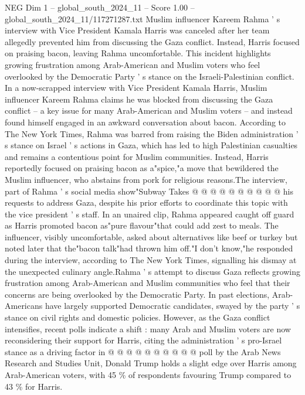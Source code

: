 \begin{textsample}{NEG Dim 1 – global\_south\_2024\_11 – Score 1.00 – global\_south\_2024\_11/117271287.txt}  \label{ex:f1_neg_283}
Muslim influencer Kareem Rahma ' s interview with Vice President Kamala Harris was canceled after her team allegedly prevented him from discussing the Gaza conflict.
Instead, Harris focused on praising bacon, leaving Rahma uncomfortable.
This incident highlights growing frustration among Arab-American and Muslim voters who feel overlooked by the Democratic Party ' s stance on the Israeli-Palestinian conflict.
In a now-scrapped interview with Vice President Kamala Harris, Muslim influencer Kareem Rahma claims he was blocked from discussing the Gaza conflict -- a key issue for many Arab-American and Muslim voters -- and instead found himself engaged in an awkward conversation about bacon.
According to The New York Times, Rahma was barred from raising the Biden administration ' s stance on Israel ' s actions in Gaza, which has led to high Palestinian casualties and remains a contentious point for Muslim communities.
Instead, Harris reportedly focused on praising bacon as a"spice,"a move that bewildered the Muslim influencer, who abstains from pork for religious reasons.The interview, part of Rahma ' s social media show"Subway Takes @ @ @ @ @ @ @ @ @ @ his requests to address Gaza, despite his prior efforts to coordinate this topic with the vice president ' s staff.
In an unaired clip, Rahma appeared caught off guard as Harris promoted bacon as"pure flavour"that could add zest to meals.
The influencer, visibly uncomfortable, asked about alternatives like beef or turkey but noted later that the"bacon talk"had thrown him off."I don't know,"he responded during the interview, according to The New York Times, signalling his dismay at the unexpected culinary angle.Rahma ' s attempt to discuss Gaza reflects growing frustration among Arab-American and Muslim communities who feel that their concerns are being overlooked by the Democratic Party.
In past elections, Arab-Americans have largely supported Democratic candidates, swayed by the party ' s stance on civil rights and domestic policies.
However, as the Gaza conflict intensifies, recent polls indicate a shift : many Arab and Muslim voters are now reconsidering their support for Harris, citing the administration ' s pro-Israel stance as a driving factor in @ @ @ @ @ @ @ @ @ @ poll by the Arab News Research and Studies Unit, Donald Trump holds a slight edge over Harris among Arab-American voters, with 45 \% of respondents favouring Trump compared to 43 \% for Harris.

\end{textsample}
